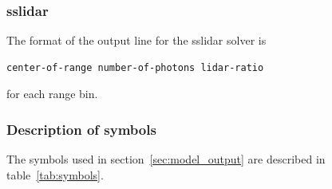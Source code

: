 \subsubsection{sslidar}
\label{subsubsec:sslidar-output}

The format of the output line for the sslidar
solver is
\begin{Verbatim}[fontsize=\footnotesize, frame=single]  
center-of-range number-of-photons lidar-ratio
\end{Verbatim}
for each range bin.

\subsubsection{Description of symbols}

The symbols used in section~\ref{sec:model_output} are described in
table~\ref{tab:symbols}.

